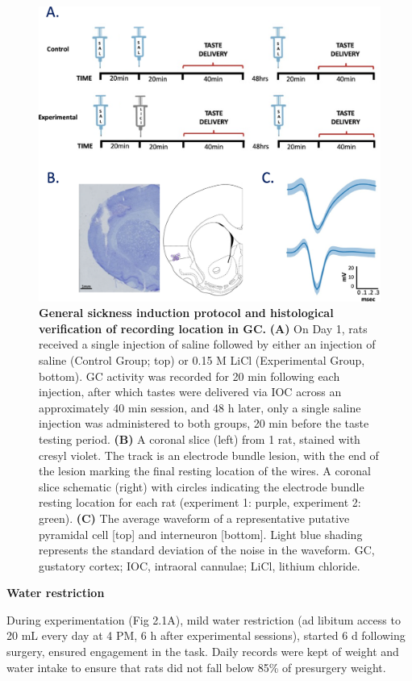 \begin{refsection}
\begin{figure}
\includegraphics[width=\linewidth]{stone_2022_figs/journal.pbio.3001537.g001.png}
\caption{\textbf{General sickness induction protocol and histological verification of recording location in GC.} \textbf{(A)} On Day 1, rats received a single injection of saline followed by either an injection of saline (Control Group; top) or 0.15 M LiCl (Experimental Group, bottom). GC activity was recorded for 20 min following each injection, after which tastes were delivered via IOC across an approximately 40 min session, and 48 h later, only a single saline injection was administered to both groups, 20 min before the taste testing period. \textbf{(B)} A coronal slice (left) from 1 rat, stained with cresyl violet. The track is an electrode bundle lesion, with the end of the lesion marking the final resting location of the wires. A coronal slice schematic (right) with circles indicating the electrode bundle resting location for each rat (experiment 1: purple, experiment 2: green). \textbf{(C)} The average waveform of a representative putative pyramidal cell [top] and interneuron [bottom]. Light blue shading represents the standard deviation of the noise in the waveform. GC, gustatory cortex; IOC, intraoral cannulae; LiCl, lithium chloride.
}
\label{fig:wrapfig}
\end{figure}

\smallskip
\noindent\textbf{Water restriction}\par
\noindent 
During experimentation (Fig 2.1A), mild water restriction (ad libitum access to 20 mL every day at 4 PM, 6 h after experimental sessions), started 6 d following surgery, ensured engagement in the task. Daily records were kept of weight and water intake to ensure that rats did not fall below 85\% of presurgery weight.


\end{refsection}

